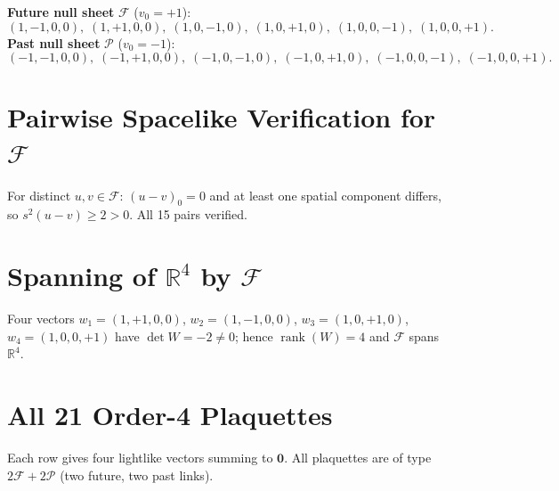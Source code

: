 \documentclass[12pt, a4paper]{article}
\theoremstyle{plain}
\theoremstyle{definition}
\theoremstyle{remark}
\newcommand{\FS}{\mathcal{F}}
\newcommand{\PS}{\mathcal{P}}
\newcommand{\ssp}{s^2}
\newcommand{\R}{\mathbb{R}}
\newcommand{\rank}{\operatorname{rank}}
\begin{document}
\noindent\textbf{Future null sheet} $\FS$ ($v_0=+1$):
\[
  (1,{-}1,0,0),\;(1,{+}1,0,0),\;(1,0,{-}1,0),\;
  (1,0,{+}1,0),\;(1,0,0,{-}1),\;(1,0,0,{+}1).
\]
\textbf{Past null sheet} $\PS$ ($v_0=-1$):
\[
  ({-}1,{-}1,0,0),\;({-}1,{+}1,0,0),\;({-}1,0,{-}1,0),\;
  ({-}1,0,{+}1,0),\;({-}1,0,0,{-}1),\;({-}1,0,0,{+}1).
\]

\section{Pairwise Spacelike Verification for $\FS$}\label{app:pairwise}

For distinct $u,v\in\FS$: $(u-v)_0=0$ and at least one spatial
component differs, so $\ssp(u-v)\geq2>0$. All 15 pairs verified.

\section{Spanning of $\R^4$ by $\FS$}\label{app:span}

Four vectors $w_1=(1,+1,0,0)$, $w_2=(1,-1,0,0)$,
$w_3=(1,0,+1,0)$, $w_4=(1,0,0,+1)$ have $\det W = -2\neq0$;
hence $\rank(W)=4$ and $\FS$ spans $\R^4$.

\section{All 21 Order-4 Plaquettes}\label{app:plaquettes}

Each row gives four lightlike vectors summing to $\bm{0}$.
All plaquettes are of type $2\FS+2\PS$
(two future, two past links).
\end{document}
